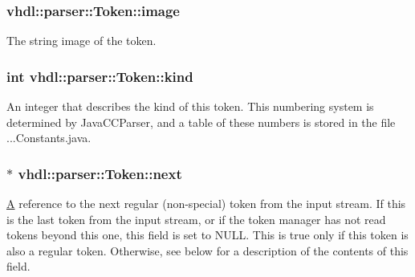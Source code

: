 \subsubsection[{image}]{ vhdl\+::parser\+::\+Token\+::image}\label{classvhdl_1_1parser_1_1_token_abafca7a99f0aca2f76d1d9094bf22e9c}
The string image of the token. \hypertarget{classvhdl_1_1parser_1_1_token_a021bfae89b9eec39a87db9577508916c}{}
\subsubsection[{kind}]{\setlength{\rightskip}{0pt plus 5cm}int vhdl\+::parser\+::\+Token\+::kind}\label{classvhdl_1_1parser_1_1_token_a021bfae89b9eec39a87db9577508916c}
An integer that describes the kind of this token. This numbering system is determined by Java\+C\+C\+Parser, and a table of these numbers is stored in the file ...Constants.\+java. \hypertarget{classvhdl_1_1parser_1_1_token_a82b2c4853d3ce100b0fee664d8460b69}{}
\subsubsection[{next}]{$\ast$ vhdl\+::parser\+::\+Token\+::next}\label{classvhdl_1_1parser_1_1_token_a82b2c4853d3ce100b0fee664d8460b69}
\hyperlink{class_a}{A} reference to the next regular (non-\/special) token from the input stream. If this is the last token from the input stream, or if the token manager has not read tokens beyond this one, this field is set to N\+U\+L\+L. This is true only if this token is also a regular token. Otherwise, see below for a description of the contents of this field. \hypertarget{classvhdl_1_1parser_1_1_token_a9d02434823908bf848cdc9bb14f52b73}{}
